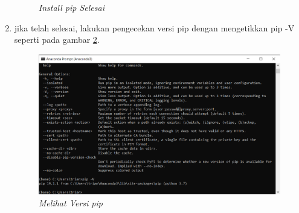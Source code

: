 \begin{enumerate}
\begin{figure}[H]
    \caption{\textit{Install pip Selesai}}
    \label{Figureanaconda11}
\end{figure}
\item jika telah selesai, lakukan pengecekan versi pip dengan mengetikkan pip -V seperti pada gambar \ref{Figureanaconda12}.
\begin{figure}[H]
    \centering
    \includegraphics[scale=0.4]{figures/pipversion}
    \caption{\textit{Melihat Versi pip}}
    \label{Figureanaconda12}
\end{figure}

\end{enumerate}

